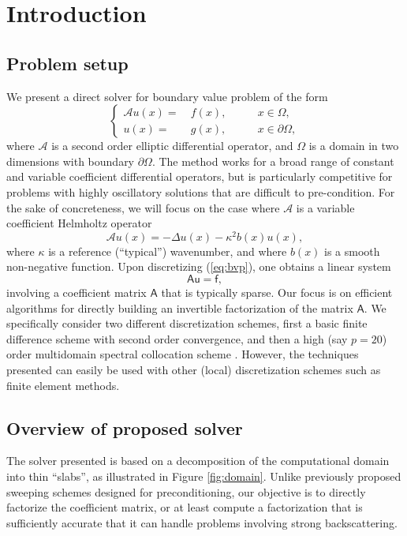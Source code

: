 \documentclass[11pt]{amsart}
\newcommand{\vct}[1]{\bm{\mathsf{#1}}}
\newcommand{\mtx}[1]{\bm{\mathsf{#1}}}
\begin{document}
\section{Introduction}

\subsection{Problem setup}
We present a direct solver for boundary value problem of the form
\begin{equation}
\label{eq:bvp}
\left\{\begin{aligned}
\mathcal A u(x) =&\ f(x),\qquad&x \in \Omega,\\
u(x) =&\ g(x),\qquad&x \in \partial \Omega,
\end{aligned}\right.
\end{equation}
where $\mathcal A$ is a second order elliptic differential operator,
and $\Omega$ is a domain in two dimensions with boundary $\partial \Omega$.
The method works for a broad range of constant and variable coefficient differential
operators, but is particularly competitive for problems with highly oscillatory solutions
that are difficult to pre-condition.
For the sake of concreteness, we will focus on the case where $\mathcal A$ is a variable
coefficient Helmholtz operator
\begin{equation}
\label{eq:var_helm}
\mathcal A u(x) = -\Delta u(x) - \kappa^{2}b(x)u(x),
\end{equation}
where $\kappa$ is a reference (``typical'') wavenumber,
and where $b(x)$ is a smooth non-negative function.
Upon discretizing (\ref{eq:bvp}), one obtains a linear system
\begin{equation}
\label{eq:Au=f}
\mtx{A}\vct{u} = \vct{f},
\end{equation}
involving a coefficient matrix $\mtx{A}$ that is typically sparse. 
Our focus is on efficient algorithms for directly
building an invertible factorization of the matrix $\mtx{A}$. We specifically consider
two different discretization schemes, first a basic finite difference scheme with
second order convergence, and then a high (say $p=20$) order multidomain 
spectral 
collocation scheme \cite[Ch.~25]{2019_martinsson_book}. 
However, the techniques presented can easily be used with other (local)
discretization schemes such as finite element methods.

\subsection{Overview of proposed solver}
\label{sec:intro_overview}
The solver presented is based on a decomposition of the 
computational domain
into thin ``slabs'', as illustrated in Figure \ref{fig:domain}.
Unlike previously proposed sweeping schemes
\cite{2011_engquist_ying,gander2017restrictions,2013_sweep_demanet}
designed for preconditioning,
our objective is to directly factorize the coefficient matrix,
or at least compute a factorization that is sufficiently accurate
that it can handle problems involving strong backscattering.
\end{document}
